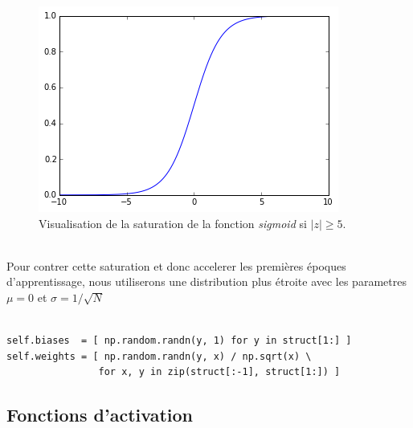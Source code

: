 \documentclass[11pt]{article}
\begin{document}
\begin{figure}[htp]
	\centering
	\includegraphics[scale=.5]{img/sigmoid_sat.png}
	\caption{Visualisation de la saturation de la fonction \emph{sigmoid} si
	$|z| \ge 5$.}
\end{figure} \\

Pour contrer cette saturation et donc accelerer les premi\`eres \'epoques
d'apprentissage, nous utiliserons une distribution plus \'etroite avec les
parametres $\mu=0$ et $\sigma =1/\sqrt{N}$ \\


 \\
\begin{lstlisting}
self.biases  = [ np.random.randn(y, 1) for y in struct[1:] ]
self.weights = [ np.random.randn(y, x) / np.sqrt(x) \
				for x, y in zip(struct[:-1], struct[1:]) ]
\end{lstlisting}


\subsection{Fonctions d'activation}
\end{document}
